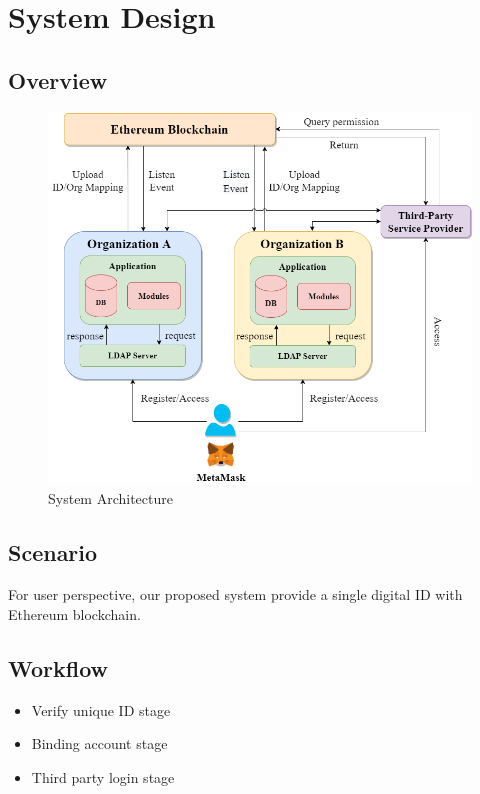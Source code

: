 \chapter{System Design}
\label{chapter:design}

\section{Overview}

\begin{figure}[hb]
    \centering
    \includegraphics[height=!,width=1\linewidth,keepaspectratio=true]{figures/system_architecture.png}
    \caption{{\footnotesize System Architecture}}
    \label{fig:system_architecture}
\end{figure}

\section{Scenario}

    For user perspective, our proposed system provide a single digital ID with Ethereum blockchain.

\section{Workflow}

\begin{itemize}
    \item Verify unique ID stage
    \item Binding account stage
    \item Third party login stage
\end{itemize}